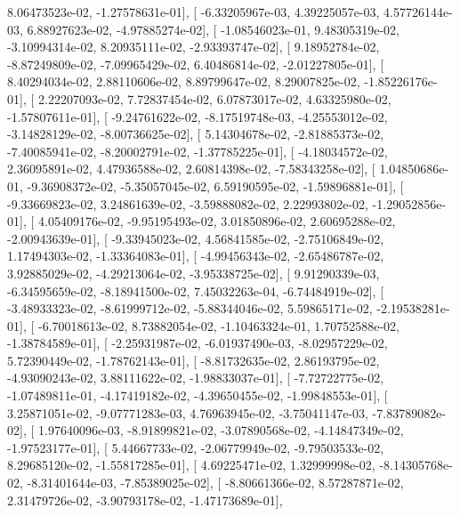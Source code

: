 \documentclass{article}
\begin{document}
          8.06473523e-02,  -1.27578631e-01],
       [ -6.33205967e-03,   4.39225057e-03,   4.57726144e-03,
          6.88927623e-02,  -4.97885274e-02],
       [ -1.08546023e-01,   9.48305319e-02,  -3.10994314e-02,
          8.20935111e-02,  -2.93393747e-02],
       [  9.18952784e-02,  -8.87249809e-02,  -7.09965429e-02,
          6.40486814e-02,  -2.01227805e-01],
       [  8.40294034e-02,   2.88110606e-02,   8.89799647e-02,
          8.29007825e-02,  -1.85226176e-01],
       [  2.22207093e-02,   7.72837454e-02,   6.07873017e-02,
          4.63325980e-02,  -1.57807611e-01],
       [ -9.24761622e-02,  -8.17519748e-03,  -4.25553012e-02,
         -3.14828129e-02,  -8.00736625e-02],
       [  5.14304678e-02,  -2.81885373e-02,  -7.40085941e-02,
         -8.20002791e-02,  -1.37785225e-01],
       [ -4.18034572e-02,   2.36095891e-02,   4.47936588e-02,
          2.60814398e-02,  -7.58343258e-02],
       [  1.04850686e-01,  -9.36908372e-02,  -5.35057045e-02,
          6.59190595e-02,  -1.59896881e-01],
       [ -9.33669823e-02,   3.24861639e-02,  -3.59888082e-02,
          2.22993802e-02,  -1.29052856e-01],
       [  4.05409176e-02,  -9.95195493e-02,   3.01850896e-02,
          2.60695288e-02,  -2.00943639e-01],
       [ -9.33945023e-02,   4.56841585e-02,  -2.75106849e-02,
          1.17494303e-02,  -1.33364083e-01],
       [ -4.99456343e-02,  -2.65486787e-02,   3.92885029e-02,
         -4.29213064e-02,  -3.95338725e-02],
       [  9.91290339e-03,  -6.34595659e-02,  -8.18941500e-02,
          7.45032263e-04,  -6.74484919e-02],
       [ -3.48933323e-02,  -8.61999712e-02,  -5.88344046e-02,
          5.59865171e-02,  -2.19538281e-01],
       [ -6.70018613e-02,   8.73882054e-02,  -1.10463324e-01,
          1.70752588e-02,  -1.38784589e-01],
       [ -2.25931987e-02,  -6.01937490e-03,  -8.02957229e-02,
          5.72390449e-02,  -1.78762143e-01],
       [ -8.81732635e-02,   2.86193795e-02,  -4.93090243e-02,
          3.88111622e-02,  -1.98833037e-01],
       [ -7.72722775e-02,  -1.07489811e-01,  -4.17419182e-02,
         -4.39650455e-02,  -1.99848553e-01],
       [  3.25871051e-02,  -9.07771283e-03,   4.76963945e-02,
         -3.75041147e-03,  -7.83789082e-02],
       [  1.97640096e-03,  -8.91899821e-02,  -3.07890568e-02,
         -4.14847349e-02,  -1.97523177e-01],
       [  5.44667733e-02,  -2.06779949e-02,  -9.79503533e-02,
          8.29685120e-02,  -1.55817285e-01],
       [  4.69225471e-02,   1.32999998e-02,  -8.14305768e-02,
         -8.31401644e-03,  -7.85389025e-02],
       [ -8.80661366e-02,   8.57287871e-02,   2.31479726e-02,
         -3.90793178e-02,  -1.47173689e-01],
\end{document}
